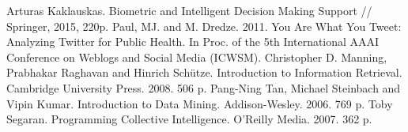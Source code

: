 \documentclass[a4paper]{report}
\begin{document}
    \begingroup
    \let\clearpage\relax
    \vskip-3cm
	\begin{thebibliography}{9}
	
		Arturas Kaklauskas. Biometric and Intelligent Decision Making Support // Springer, 2015, 220p.
		Paul, MJ. and M. Dredze. 2011. You Are What You Tweet: Analyzing Twitter for Public Health. In Proc. of the 5th International AAAI Conference on Weblogs and Social Media (ICWSM). 
		Christopher D. Manning, Prabhakar Raghavan and Hinrich Schütze. Introduction to Information Retrieval. Cambridge University Press. 2008. 506 p.
		Pang-Ning Tan, Michael Steinbach and Vipin Kumar. Introduction to Data Mining. Addison-Wesley. 2006. 769 p.
		Toby Segaran. Programming Collective Intelligence. O'Reilly Media. 2007. 362 p.
		
		
		

		
		
		
		
		
		
		
		
		

\end{thebibliography}
\end{document}
